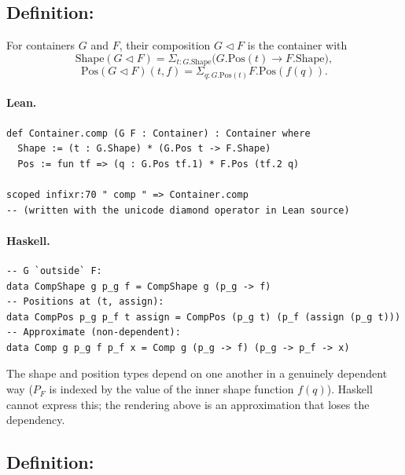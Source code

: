 \documentclass[11pt,a4paper]{article}
\begin{document}
\subsection{Definition: }

\begin{defn}
For containers $G$ and $F$, their composition $G \triangleleft F$ is the
container with
\[
  \mathrm{Shape}(G \triangleleft F) = \Sigma_{t : G.\mathrm{Shape}}
    \bigl(G.\mathrm{Pos}(t) \to F.\mathrm{Shape}\bigr),
\]
\[
  \mathrm{Pos}(G \triangleleft F)(t, f) = \Sigma_{q : G.\mathrm{Pos}(t)}
    F.\mathrm{Pos}(f(q)).
\]
\end{defn}

\paragraph{Lean.}
\begin{lstlisting}[style=lean]
def Container.comp (G F : Container) : Container where
  Shape := (t : G.Shape) * (G.Pos t -> F.Shape)
  Pos := fun tf => (q : G.Pos tf.1) * F.Pos (tf.2 q)

scoped infixr:70 " comp " => Container.comp
-- (written with the unicode diamond operator in Lean source)
\end{lstlisting}

\paragraph{Haskell.}
\begin{lstlisting}[style=haskell]
-- G `outside` F:
data CompShape g p_g f = CompShape g (p_g -> f)
-- Positions at (t, assign):
data CompPos p_g p_f t assign = CompPos (p_g t) (p_f (assign (p_g t)))
-- Approximate (non-dependent):
data Comp g p_g f p_f x = Comp g (p_g -> f) (p_g -> p_f -> x)
\end{lstlisting}

\begin{fidelitynote}
The shape and position types depend on one another in a genuinely dependent
way ($P_F$ is indexed by the value of the inner shape function $f(q)$).
Haskell cannot express this; the rendering above is an approximation that
loses the dependency.
\end{fidelitynote}


\subsection{Definition: }
\end{document}
